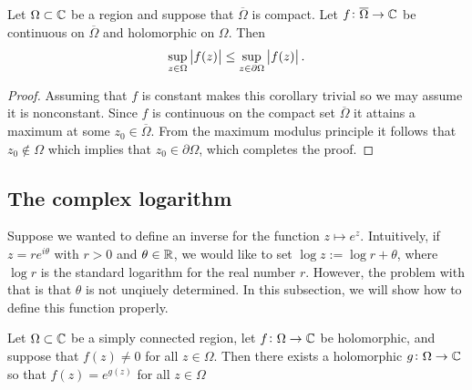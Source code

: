 \documentclass[11pt,a4paper]{article}
\begin{document}
\begin{corollary}
  \label{cor:max-attained-at-boundary}
  Let $\Omega \subset \mathbb{C}$ be a region and suppose that $\overline \Omega$
  is compact.
  Let $f \colon \overline \Omega \to \mathbb{C}$ be continuous on $\overline \Omega$
  and holomorphic on $\Omega$.
  Then
  \[
    \sup_{z \in \Omega} \left\lvert f(z)\right\rvert \le
    \sup_{z \in \partial \Omega} \left\lvert f(z)\right\rvert.
  \]
\end{corollary}
\begin{proof}
  Assuming that $f$ is constant makes this corollary trivial
  so we may assume it is nonconstant.
  Since $f$ is continuous on the compact set $\overline \Omega$ it attains
  a maximum at some $z_0 \in \overline \Omega$.
  From the maximum modulus principle it follows that $z_0 \notin \Omega$
  which implies that $z_0 \in \partial \Omega$, which completes the proof.
\end{proof}


\subsection{The complex logarithm}
\begin{remark}
  Suppose we wanted to define an inverse for the function $z \mapsto e^z$.
  Intuitively, if $z = r e^{i \theta}$ with $r > 0$ and $\theta \in \mathbb{R}$,
  we would like to set $\log z := \log r + \theta$, where $\log r$ is the
  standard logarithm for the real number $r$.
  However, the problem with that is that $\theta$ is not unqiuely determined.
  In this subsection, we will show how to define this function properly.
\end{remark}

\begin{proposition}
  \label{prp:simply-connected-region-logarithm}
  Let $\Omega \subset \mathbb{C}$ be a simply connected region,
  let $f \colon \Omega \to \mathbb{C}$ be holomorphic,
  and suppose that $f(z) \neq 0$ for all $z \in \Omega$.
  Then there exists a holomorphic $g \colon \Omega \to \mathbb{C}$ so that
  $f(z) = e^{g(z)}$ for all $z \in \Omega$
\end{proposition}
\end{document}
